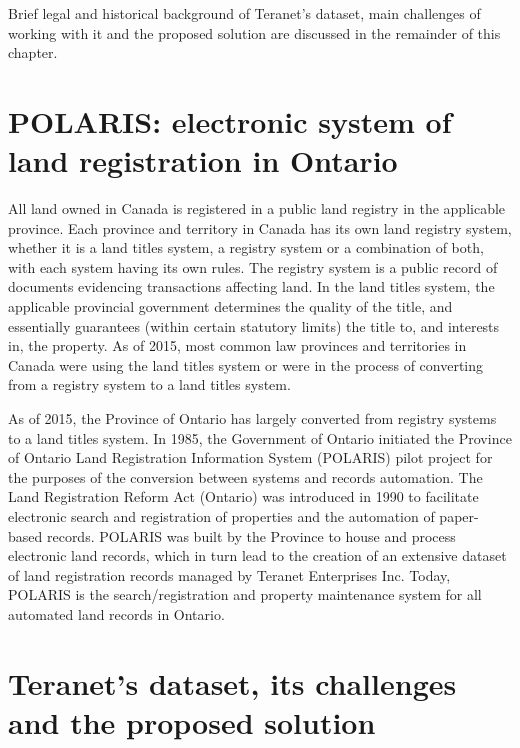 Brief legal and historical background of Teranet's dataset, main challenges of working with it and the proposed solution are discussed in the remainder of this chapter.

\section{POLARIS: electronic system of land registration in Ontario} \label{sec:polaris}

All land owned in Canada is registered in a public land registry in the applicable province.
Each province and territory in Canada has its own land registry system, whether it is a land titles system, a registry system or a combination of both, with each system having its own rules.
The registry system is a public record of documents evidencing transactions affecting land.
In the land titles system, the applicable provincial government determines the quality of the title, and essentially guarantees (within certain statutory limits) the title to, and interests in, the property.
As of 2015, most common law provinces and territories in Canada were using the land titles system or were in the process of converting from a registry system to a land titles system\cite{McKean2015}.

As of 2015, the Province of Ontario has largely converted from registry systems to a land titles system.
In 1985, the Government of Ontario initiated the Province of Ontario Land Registration Information System (POLARIS) pilot project for the purposes of the conversion between systems and records automation.
The Land Registration Reform Act (Ontario)\cite{TheGovernmentofOntario1990} was introduced in 1990 to facilitate electronic search and registration of properties and the automation of paper-based records.
POLARIS was built by the Province to house and process electronic land records, which in turn lead to the creation of an extensive dataset of land registration records managed by Teranet Enterprises Inc.
Today, POLARIS is the search/registration and property maintenance system for all automated land records in Ontario.

\section{Teranet's dataset, its challenges and the proposed solution} \label{sec:teranet_challenges_solution}

